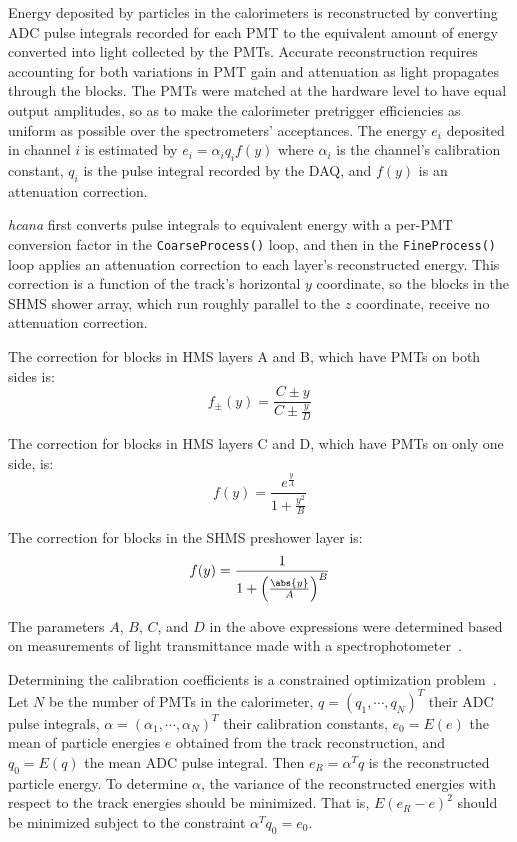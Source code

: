 Energy deposited by particles in the calorimeters is reconstructed by
converting ADC pulse integrals recorded for each PMT to
the equivalent amount of energy converted into light collected by the PMTs.
Accurate reconstruction requires accounting for both
variations in PMT gain
and
attenuation as light propagates through the blocks.
The PMTs were matched at the hardware level to have equal output amplitudes, so
as to make the calorimeter pretrigger efficiencies as uniform as possible over
the spectrometers' acceptances.
The energy $e_i$ deposited in channel $i$ is estimated by
$e_i = \alpha_i q_i f(y)$
where
$\alpha_i$ is the channel's calibration constant,
$q_i$ is the pulse integral recorded by the DAQ,
and $f(y)$ is an attenuation correction.

\textit{hcana} first converts pulse integrals to equivalent energy with a
per-PMT conversion factor in the \texttt{CoarseProcess()} loop, and then
in the \texttt{FineProcess()} loop applies an attenuation correction
to each layer's reconstructed energy.
This correction is a function of the track's horizontal $y$ coordinate, so the
blocks in the SHMS shower array, which run roughly parallel to the $z$
coordinate, receive no attenuation correction.

The correction for blocks in HMS layers A and B, which have PMTs on both sides is:
\begin{equation}
    f_{\pm}(y) = \frac{C \pm y}{C \pm \frac{y}{D}}
\end{equation}

The correction for blocks in HMS layers C and D, which have PMTs on only one side, is:
\begin{equation}
    f(y) = \frac{e^{\frac{y}{A}}}{1 + \frac{y^2}{B}}
\end{equation}

The correction for blocks in the SHMS preshower layer is:
\begin{equation}
    f(y) = \frac{1}{1 + \left(\frac{\abs{y}}{A}\right)^B}
\end{equation}

The parameters $A$, $B$, $C$, and $D$ in the above expressions were determined
based on measurements of light transmittance made with a
spectrophotometer~\cite{Mkrtchyan_2012}.


Determining the calibration coefficients is a constrained optimization
problem~\cite{Amatuni, Vardan_cal_slides}.
Let $N$ be the number of PMTs in the calorimeter,
$q = (q_1, \cdots, q_N)^T$ their ADC pulse integrals,
$\alpha = (\alpha_1, \cdots, \alpha_N)^T$ their calibration constants,
$e_0 = E(e)$ the mean of particle energies $e$ obtained from the track reconstruction,
and $q_0 = E(q)$ the mean ADC pulse integral.
Then $e_R = \alpha^T q$ is the reconstructed particle energy.
To determine $\alpha$, the variance of the reconstructed energies with respect
to the track energies should be minimized.
That is, $E(e_R-e)^2$ should be minimized subject to the constraint
$\alpha^T q_0=e_0$.

